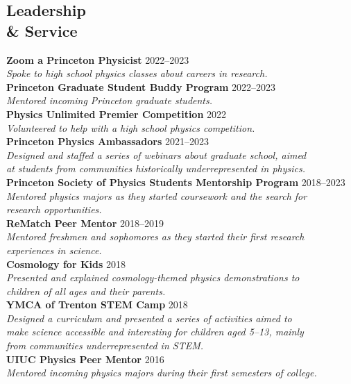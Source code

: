 \documentclass[margin,line,11pt]{resume}
\begin{document}
\begin{resume}
\section{\mysidestyle Leadership \\ \& Service}
\textbf{Zoom a Princeton Physicist} \hfill 2022--2023\\
\textit{Spoke to high school physics classes about careers in research.} \vspace{2mm} \\
\textbf{Princeton Graduate Student Buddy Program} \hfill 2022--2023\\
\textit{Mentored incoming Princeton graduate students.} \vspace{2mm} \\
\textbf{Physics Unlimited Premier Competition} \hfill 2022\\
\textit{Volunteered to help with a high school physics competition.} \vspace{2mm} \\
\textbf{Princeton Physics Ambassadors} \hfill 2021--2023\\
\textit{Designed and staffed a series of webinars about graduate school, aimed \\
at students from communities historically underrepresented in physics.} \vspace{2mm} \\
\clearpage
\textbf{Princeton Society of Physics Students Mentorship Program} \hfill 2018--2023\\
\textit{Mentored physics majors as they started coursework and the search for \\
research opportunities.}\vspace{2mm} \\
\textbf{ReMatch Peer Mentor} \hfill 2018--2019\\
\textit{Mentored freshmen and sophomores as they started their first research \\
experiences in science.} \vspace{2mm} \\
\textbf{Cosmology for Kids} \hfill 2018\\
\textit{Presented and explained cosmology-themed physics demonstrations to \\
children of all ages and their parents.} \vspace{2mm} \\
\textbf{YMCA of Trenton STEM Camp} \hfill 2018\\
\textit{Designed a curriculum and presented a series of activities aimed to \\
make science accessible and interesting for children aged 5--13, mainly \\
from communities underrepresented in STEM.} \vspace{2mm} \\
\textbf{UIUC Physics Peer Mentor} \hfill 2016\\
\textit{Mentored incoming physics majors during their first semesters of college.} \vspace{2mm} \\


\end{resume}
\end{document}
